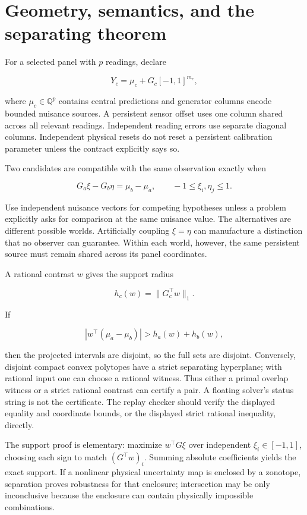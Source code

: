 \documentclass[
  11pt,
  a4paper,
]{report}
\begin{document}
\hypertarget{geometry-semantics-and-the-separating-theorem}{%
\section{Geometry, semantics, and the separating
theorem}\label{geometry-semantics-and-the-separating-theorem}}

For a selected panel with \(p\) readings, declare

\[
Y_c=\mu_c+G_c[-1,1]^{m_c},
\]

where \(\mu_c\in\mathbb Q^p\) contains central predictions and generator
columns encode bounded nuisance sources. A persistent sensor offset uses
one column shared across all relevant readings. Independent reading
errors use separate diagonal columns. Independent physical resets do not
reset a persistent calibration parameter unless the contract explicitly
says so.

Two candidates are compatible with the same observation exactly when

\[
G_a\xi-G_b\eta=\mu_b-\mu_a,
\qquad -1\le\xi_i,\eta_j\le1.
\]

Use independent nuisance vectors for competing hypotheses unless a
problem explicitly asks for comparison at the same nuisance value. The
alternatives are different possible worlds. Artificially coupling
\(\xi=\eta\) can manufacture a distinction that no observer can
guarantee. Within each world, however, the same persistent source must
remain shared across its panel coordinates.

A rational contrast \(w\) gives the support radius

\[
h_c(w)=\|G_c^\top w\|_1.
\]

If

\[
|w^\top(\mu_a-\mu_b)|>h_a(w)+h_b(w),
\]

then the projected intervals are disjoint, so the full sets are
disjoint. Conversely, disjoint compact convex polytopes have a strict
separating hyperplane; with rational input one can choose a rational
witness. Thus either a primal overlap witness or a strict rational
contrast can certify a pair. A floating solver's status string is not
the certificate. The replay checker should verify the displayed equality
and coordinate bounds, or the displayed strict rational inequality,
directly.

The support proof is elementary: maximize \(w^\top G\xi\) over
independent \(\xi_i\in[-1,1]\), choosing each sign to match
\((G^\top w)_i\). Summing absolute coefficients yields the exact
support. If a nonlinear physical uncertainty map is enclosed by a
zonotope, separation proves robustness for that enclosure; intersection
may be only inconclusive because the enclosure can contain physically
impossible combinations.
\end{document}
